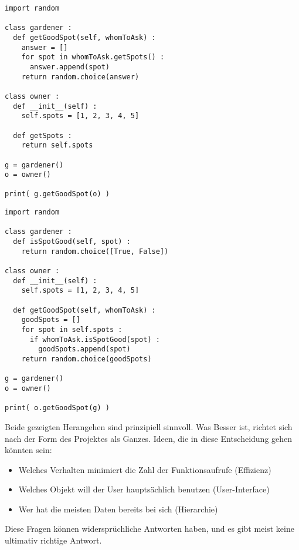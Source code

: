 \begin{frame}[fragile]
%
\begin{tcbraster}[raster columns=2,
                  raster equal height,
                  nobeforeafter,
                  raster column skip=0.5cm]
\begin{codebox}
\begin{verbatim}
import random

class gardener :
  def getGoodSpot(self, whomToAsk) :
    answer = []
    for spot in whomToAsk.getSpots() :
      answer.append(spot)
    return random.choice(answer)

class owner :
  def __init__(self) :
    self.spots = [1, 2, 3, 4, 5]
  
  def getSpots :
    return self.spots

g = gardener()
o = owner()

print( g.getGoodSpot(o) )
\end{verbatim}
\end{codebox}
%
\begin{codebox}
\begin{verbatim}
import random

class gardener :
  def isSpotGood(self, spot) :
    return random.choice([True, False])

class owner :
  def __init__(self) :
    self.spots = [1, 2, 3, 4, 5]
  
  def getGoodSpot(self, whomToAsk) :
    goodSpots = []
    for spot in self.spots :
      if whomToAsk.isSpotGood(spot) :
        goodSpots.append(spot)
    return random.choice(goodSpots)
    
g = gardener()
o = owner()

print( o.getGoodSpot(g) )
\end{verbatim}
\end{codebox}
\end{tcbraster}
%
\end{frame}


\begin{frame}
%
\begin{hintbox}
Beide gezeigten Herangehen sind prinzipiell sinnvoll. Was Besser ist, richtet sich nach der Form des Projektes als Ganzes. Ideen, die in diese Entscheidung gehen könnten sein:
\begin{itemize}
\item Welches Verhalten minimiert die Zahl der Funktionsaufrufe (\thus Effizienz)
\item Welches Objekt will der User hauptsächlich benutzen (\thus User-Interface)
\item Wer hat die meisten Daten bereits bei sich (\thus Hierarchie)
\end{itemize}

Diese Fragen können widersprüchliche Antworten haben, und es gibt meist keine ultimativ richtige Antwort.
\end{hintbox}
%
\end{frame}

